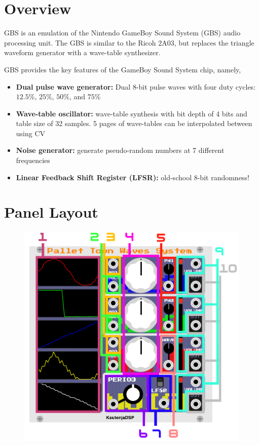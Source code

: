 \documentclass[12pt,letter]{article}
\begin{document}


\section{Overview}

GBS is an emulation of the Nintendo GameBoy Sound System (GBS) audio processing unit. The GBS is similar to the Ricoh 2A03, but replaces the triangle waveform generator with a wave-table synthesizer.

GBS provides the key features of the GameBoy Sound System chip, namely,
\begin{itemize}
  \item \textbf{Dual pulse wave generator:} Dual 8-bit pulse waves with four duty cycles: $12.5\%$, $25\%$, $50\%$, and $75\%$
  \item \textbf{Wave-table oscillator:} wave-table synthesis with bit depth of 4 bits and table size of 32 samples. 5 pages of wave-tables can be interpolated between using CV
  \item \textbf{Noise generator:} generate pseudo-random numbers at 7 different frequencies
  \item \textbf{Linear Feedback Shift Register (LFSR):} old-school 8-bit randomness!
\end{itemize}


\clearpage
\section{Panel Layout}

\begin{figure}[!htp]
\centering
\includegraphics{PalletTownWavesSystem-Manual}
\end{figure}
\end{document}
